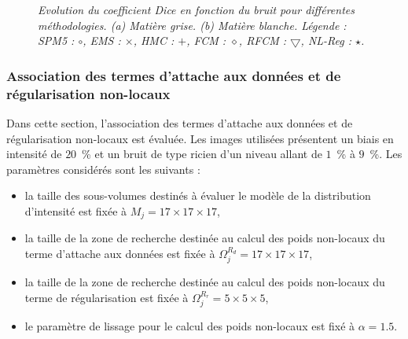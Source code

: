 \begin{figure}[!thbp]
\begin{center}
\caption{\emph{Evolution du coefficient Dice en fonction du bruit pour différentes méthodologies. (a) Matière grise. (b) Matière blanche. Légende : SPM5 : $\circ$, EMS : $\times$, HMC : $+$, FCM : $\diamond$, RFCM : $\bigtriangledown$, NL-Reg : $\star$.}\label{FIG:DICE:BRAINWEB:NOISE}}
\end{center}
\end{figure}

\subsubsection{Association des termes d'attache aux données et de régularisation non-locaux}
\label{sec:brainweb:nlAll}

Dans cette section, l'association des termes d'attache aux données et de régularisation non-locaux est évaluée.
Les images utilisées présentent un biais en intensité de $20$~\% et un bruit de type ricien d'un niveau allant de $1$~\% à $9$~\%.
Les paramètres considérés sont les suivants : 
\begin{itemize}
\item la taille des sous-volumes destinés à évaluer le modèle de la distribution d'intensité est fixée à $M_j = 17\times17\times17$, 
\item la taille de la zone de recherche destinée au calcul des poids non-locaux du terme d'attache aux données est fixée à $\Omega^{R_{d}}_{j} = 17\times17\times17$, 
\item la taille de la zone de recherche destinée au calcul des poids non-locaux du terme de régularisation est fixée à $\Omega^{R_{r}}_{j} = 5\times5\times5$,
\item le paramètre de lissage pour le calcul des poids non-locaux est fixé à $\alpha = 1.5$.
\end{itemize}

